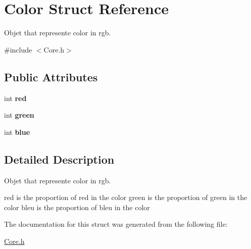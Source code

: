 \hypertarget{structColor}{\section{Color Struct Reference}
\label{structColor}
}


Objet that represente color in rgb.  




{\ttfamily \#include $<$Core.\-h$>$}

\subsection*{Public Attributes}
\begin{DoxyCompactItemize}
\item 
\hypertarget{structColor_a3cd71f006939f83ecd756f0ed28db40e}{int {\bfseries red}}\label{structColor_a3cd71f006939f83ecd756f0ed28db40e}

\item 
\hypertarget{structColor_afc8d0d81900a12497d1ce001e52b7020}{int {\bfseries green}}\label{structColor_afc8d0d81900a12497d1ce001e52b7020}

\item 
\hypertarget{structColor_a51f2c5eb0ffc788331255fa1c7812880}{int {\bfseries blue}}\label{structColor_a51f2c5eb0ffc788331255fa1c7812880}

\end{DoxyCompactItemize}


\subsection{Detailed Description}
Objet that represente color in rgb. 

red is the proportion of red in the color green is the proportion of green in the color bleu is the proportion of bleu in the color 

The documentation for this struct was generated from the following file\-:\begin{DoxyCompactItemize}
\item 
\hyperlink{Core_8h}{Core.\-h}\end{DoxyCompactItemize}

